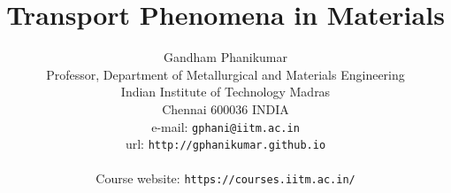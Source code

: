 \documentclass[a4paper,12pt,openany,ans]{book}
\author{Gandham Phanikumar \\
Professor, Department of Metallurgical and Materials Engineering\\
Indian Institute of Technology Madras\\
Chennai 600036 INDIA\\
{e-mail: \tt gphani@iitm.ac.in}\\
{url: \tt http://gphanikumar.github.io}\\
\vspace{1 in}\\
{Course website: \tt https://courses.iitm.ac.in/}
}
\title{Transport Phenomena in Materials}
\begin{document}



\thispagestyle{empty}



\maketitle


\tableofcontents

\listoffigures

\listoftables

\renewcommand{\listtheoremname}{List of Learning Objectives}
\listoftheorems



\newpage





























%






















\printindex
\end{document}
